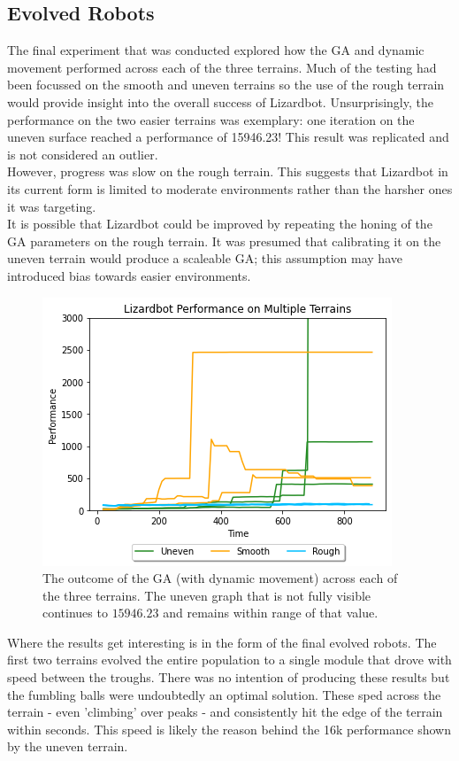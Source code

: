 \documentclass{article}
\begin{document}
\subsection{Evolved Robots}
\label{sec:Robot Res}
The final experiment that was conducted explored how the GA and dynamic movement performed across each of the three terrains. Much of the testing had been focussed on the smooth and uneven terrains so the use of the rough terrain would provide insight into the overall success of Lizardbot. Unsurprisingly, the performance on the two easier terrains was exemplary: one iteration on the uneven surface reached a performance of 15946.23!  This result was replicated and is not considered an outlier.\\
\noindent However, progress was slow on the rough terrain. This suggests that Lizardbot in its current form is limited to moderate environments rather than the harsher ones it was targeting. \\

It is possible that Lizardbot could be improved by repeating the honing of the GA parameters on the rough terrain. It was presumed that calibrating it on the uneven terrain would produce a scaleable GA; this assumption may have introduced bias towards easier environments.  
\begin{figure}[H]
\centering
\includegraphics[scale=0.8]{multipleTerrains}
\caption{The outcome of the GA (with dynamic movement) across each of the three terrains. The uneven graph that is not fully visible continues to $15946.23$ and remains within range of that value.}
\end{figure}

Where the results get interesting is in the form of the final evolved robots. The first two terrains evolved the entire population to a single module that drove with speed between the troughs. There was no intention of producing these results but the fumbling balls were undoubtedly an optimal solution. These sped across the terrain - even 'climbing' over peaks - and consistently hit the edge of the terrain within seconds. This speed is likely the reason behind the 16k performance shown by the uneven terrain. \\
\end{document}
